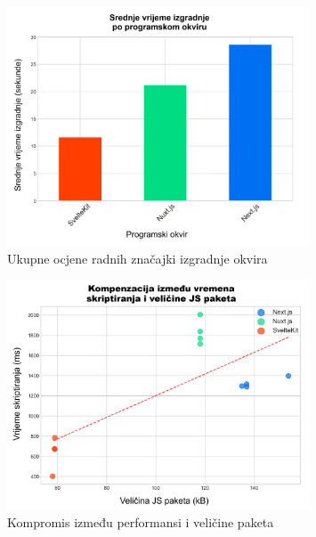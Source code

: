 \begin{figure}[H]
    \centering
    \includegraphics[width=0.8\textwidth]{slike/rezultati/dodatne-metrike/overall_framework_build_performance.png}
    \caption{Ukupne ocjene radnih značajki izgradnje okvira}
    \label{fig:overall_framework_build_performance}
\end{figure}

\begin{figure}[H]
    \centering
    \includegraphics[width=0.8\textwidth]{slike/rezultati/dodatne-metrike/performance_vs_bundle_size_tradeoff.png}
    \caption{Kompromis između performansi i veličine paketa}
    \label{fig:performance_vs_bundle_size_tradeoff}
\end{figure}

